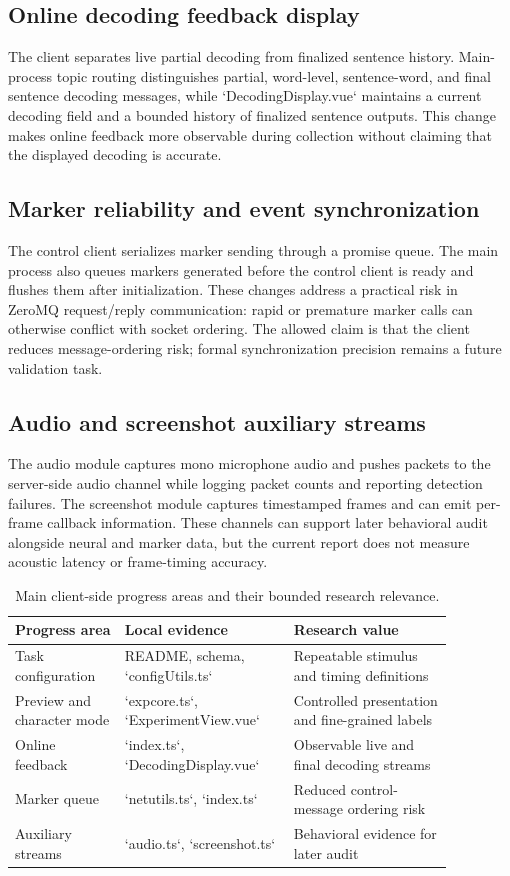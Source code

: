 \documentclass[11pt]{article}
\begin{document}
\subsection{Online decoding feedback display}
The client separates live partial decoding from finalized sentence history. Main-process topic routing distinguishes partial, word-level, sentence-word, and final sentence decoding messages, while `DecodingDisplay.vue` maintains a current decoding field and a bounded history of finalized sentence outputs. This change makes online feedback more observable during collection without claiming that the displayed decoding is accurate.

\subsection{Marker reliability and event synchronization}
The control client serializes marker sending through a promise queue. The main process also queues markers generated before the control client is ready and flushes them after initialization. These changes address a practical risk in ZeroMQ request/reply communication: rapid or premature marker calls can otherwise conflict with socket ordering. The allowed claim is that the client reduces message-ordering risk; formal synchronization precision remains a future validation task.

\subsection{Audio and screenshot auxiliary streams}
The audio module captures mono microphone audio and pushes packets to the server-side audio channel while logging packet counts and reporting detection failures. The screenshot module captures timestamped frames and can emit per-frame callback information. These channels can support later behavioral audit alongside neural and marker data, but the current report does not measure acoustic latency or frame-timing accuracy.

\begin{table}[t]
\centering
\small
\begin{tabular}{p{0.22\linewidth}p{0.33\linewidth}p{0.32\linewidth}}
\toprule
Progress area & Local evidence & Research value \\
\midrule
Task configuration & README, schema, `configUtils.ts` & Repeatable stimulus and timing definitions \\
Preview and character mode & `expcore.ts`, `ExperimentView.vue` & Controlled presentation and fine-grained labels \\
Online feedback & `index.ts`, `DecodingDisplay.vue` & Observable live and final decoding streams \\
Marker queue & `netutils.ts`, `index.ts` & Reduced control-message ordering risk \\
Auxiliary streams & `audio.ts`, `screenshot.ts` & Behavioral evidence for later audit \\
\bottomrule
\end{tabular}
\caption{Main client-side progress areas and their bounded research relevance.}
\end{table}
\end{document}
